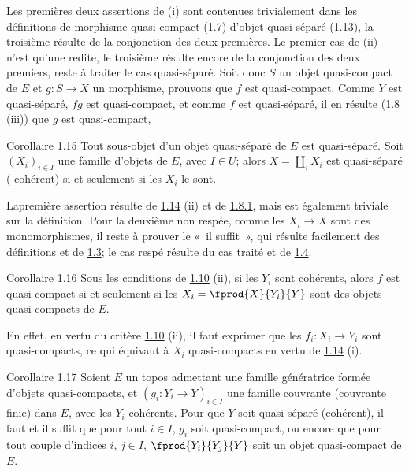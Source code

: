 Les premières deux assertions de (i) sont contenues trivialement dans
les définitions de morphisme quasi-compact (\hyperref[VI.def1.7]{1.7}) \resp d'objet
quasi-séparé (\hyperref[VI.def1.13]{1.13}), la troisième résulte de la conjonction des deux
premières. Le premier cas de (ii) n'est qu'une redite, le troisième
résulte encore de la conjonction des deux premiers, reste à traiter le
cas quasi-séparé. Soit donc $S$  un objet quasi-compact de $E$ et $g:
S\to X$ un morphisme, prouvons que $f$ est quasi-compact. Comme $Y$
est quasi-séparé, $fg$ est quasi-compact, et comme $f$ est
quasi-séparé, il en résulte (\hyperref[VI.prop1.8]{1.8} (iii)) que $g$ est quasi-compact,
\cqfd

\begin{enonce*}{Corollaire 1.15}
Tout sous-objet d'un objet quasi-séparé de $E$ est quasi-séparé. Soit
$(X_i)_{i \in I}$ une famille d'objets de $E$, avec $I \in U$; alors
$X = \amalg_i X_i$ est quasi-séparé (\emph{\resp}
cohérent) si et seulement si les $X_i$ le sont.
\end{enonce*}

La\pageoriginale première assertion résulte de \hyperref[VI.prop1.14]{1.14} (ii) et de \hyperref[VI.cor1.8.1]{1.8.1}, mais est
également triviale sur la définition. Pour la deuxième non respée,
comme les $X_i \to X$ sont des monomorphismes, il reste à prouver le
« il suffit », qui résulte facilement des définitions et de \hyperref[VI.prop1.3]{1.3}; le
cas respé résulte du cas traité et de \hyperref[VI.cor1.4]{1.4}.

\begin{enonce*}{Corollaire 1.16}
Sous les conditions de \hyperref[VI.prop1.10]{1.10} (ii), si les $Y_i$ sont cohérents, alors
$f$ est quasi-compact si et seulement si les $X_i = \fprod{X}{Y_i}{Y}$
sont des objets quasi-compacts de $E$.
\end{enonce*}

En effet, en vertu du critère \hyperref[VI.prop1.10]{1.10} (ii), il faut exprimer que les $f_i
: X_i \to Y_i$ sont quasi-compacts, ce qui équivaut à $X_i$
quasi-compacts en vertu de \hyperref[VI.prop1.14]{1.14} (i).

\begin{enonce*}{Corollaire 1.17}
Soient $E$ un topos admettant une famille génératrice formée
d'objets quasi-compacts, et $(g_i : Y_i \to Y)_{i \in I}$ une
famille couvrante (\resp couvrante finie) dans $E$, avec les $Y_i$
cohérents. Pour que $Y$ soit quasi-séparé (\resp cohérent), il faut
et il suffit que pour tout $i \in I$, $g_i$ soit quasi-compact, ou
encore que pour tout couple d'indices $i$, $j \in I$,
$\fprod{Y_i}{Y_j}{Y}$ soit un objet quasi-compact de $E$.
\end{enonce*}

